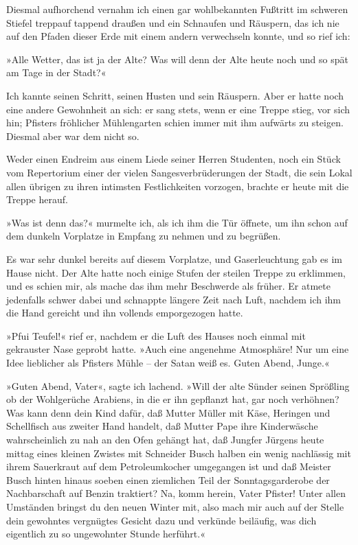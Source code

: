 Diesmal aufhorchend vernahm ich einen gar wohlbekannten Fußtritt im
schweren Stiefel treppauf tappend draußen und ein Schnaufen und
Räuspern, das ich nie auf den Pfaden dieser Erde mit einem andern
verwechseln konnte, und so rief ich:

»Alle Wetter, das ist ja der Alte? Was will denn der Alte heute
noch und so spät am Tage in der Stadt?«

Ich kannte seinen Schritt, seinen Husten und sein Räuspern. Aber er
hatte noch eine andere Gewohnheit an sich: er sang stets, wenn er
eine Treppe stieg, vor sich hin; Pfisters fröhlicher Mühlengarten
schien immer mit ihm aufwärts zu steigen. Diesmal aber war dem
nicht so.

Weder einen Endreim aus einem Liede seiner Herren Studenten, noch
ein Stück vom Repertorium einer der vielen Sangesverbrüderungen der
Stadt, die sein Lokal allen übrigen zu ihren intimsten
Festlichkeiten vorzogen, brachte er heute mit die Treppe herauf.

»Was ist denn das?« murmelte ich, als ich ihm die Tür öffnete, um
ihn schon auf dem dunkeln Vorplatze in Empfang zu nehmen und zu
begrüßen.

Es war sehr dunkel bereits auf diesem Vorplatze, und Gaserleuchtung
gab es im Hause nicht. Der Alte hatte noch einige Stufen der
steilen Treppe zu erklimmen, und es schien mir, als mache das ihm
mehr Beschwerde als früher. Er atmete jedenfalls schwer dabei und
schnappte längere Zeit nach Luft, nachdem ich ihm die Hand gereicht
und ihn vollends emporgezogen hatte.

»Pfui Teufel!« rief er, nachdem er die Luft des Hauses noch einmal
mit gekrauster Nase geprobt hatte. »Auch eine angenehme Atmosphäre!
Nur um eine Idee lieblicher als Pfisters Mühle – der Satan weiß es.
Guten Abend, Junge.«

»Guten Abend, Vater«, sagte ich lachend. »Will der alte Sünder
seinen Sprößling ob der Wohlgerüche Arabiens, in die er ihn
gepflanzt hat, gar noch verhöhnen? Was kann denn dein Kind dafür,
daß Mutter Müller mit Käse, Heringen und Schellfisch aus zweiter
Hand handelt, daß Mutter Pape ihre Kinderwäsche wahrscheinlich zu
nah an den Ofen gehängt hat, daß Jungfer Jürgens heute mittag eines
kleinen Zwistes mit Schneider Busch halben ein wenig nachlässig mit
ihrem Sauerkraut auf dem Petroleumkocher umgegangen ist und daß
Meister Busch hinten hinaus soeben einen ziemlichen Teil der
Sonntagsgarderobe der Nachbarschaft auf Benzin traktiert? Na, komm
herein, Vater Pfister! Unter allen Umständen bringst du den neuen
Winter mit, also mach mir auch auf der Stelle dein gewohntes
vergnügtes Gesicht dazu und verkünde beiläufig, was dich eigentlich
zu so ungewohnter Stunde herführt.«

